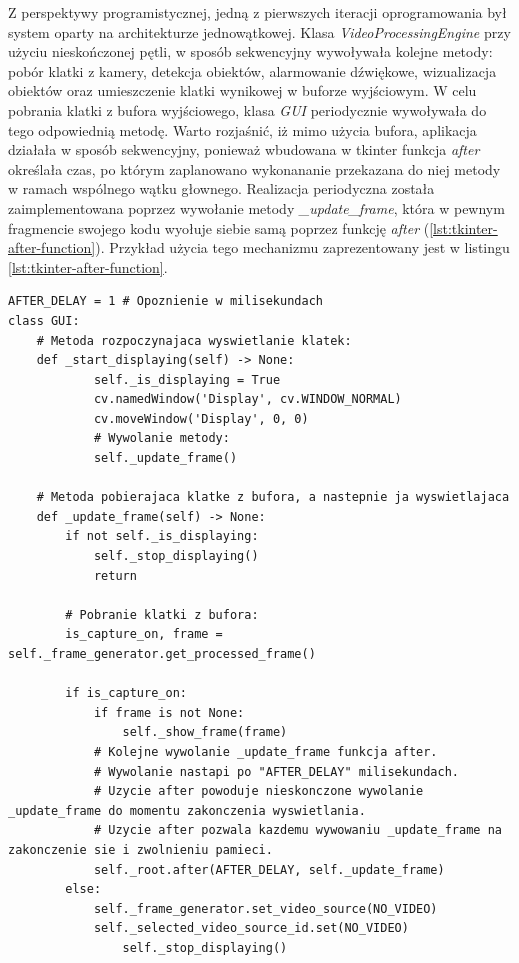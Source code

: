 Z perspektywy programistycznej, jedną z pierwszych iteracji oprogramowania był system oparty na architekturze jednowątkowej. Klasa \emph{VideoProcessingEngine} przy użyciu nieskończonej pętli, w sposób sekwencyjny wywoływała kolejne metody: pobór klatki z kamery, detekcja obiektów, alarmowanie dźwiękowe, wizualizacja obiektów oraz umieszczenie klatki wynikowej w buforze wyjściowym. W celu pobrania klatki z bufora wyjściowego, klasa \emph{GUI} periodycznie wywoływała do tego odpowiednią metodę. Warto rozjaśnić, iż mimo użycia bufora, aplikacja działała w sposób sekwencyjny, ponieważ wbudowana w tkinter funkcja \emph{after} określała czas, po którym zaplanowano wykonananie przekazana do niej metody w ramach wspólnego wątku głownego. Realizacja periodyczna została zaimplementowana poprzez wywołanie metody \emph{\_update\_frame}, która w pewnym fragmencie swojego kodu wyołuje siebie samą poprzez funkcję \emph{after} (\ref{lst:tkinter-after-function}). Przykład użycia tego mechanizmu zaprezentowany jest w listingu \ref{lst:tkinter-after-function}.

\begin{lstlisting}[caption={Fragment kodu zawierający użycie mechanizmu \emph{after}}, label={lst:tkinter-after-function}]
AFTER_DELAY = 1 # Opoznienie w milisekundach
class GUI:
    # Metoda rozpoczynajaca wyswietlanie klatek:
    def _start_displaying(self) -> None:
            self._is_displaying = True
            cv.namedWindow('Display', cv.WINDOW_NORMAL)
            cv.moveWindow('Display', 0, 0)
            # Wywolanie metody:
            self._update_frame()

    # Metoda pobierajaca klatke z bufora, a nastepnie ja wyswietlajaca
    def _update_frame(self) -> None:
        if not self._is_displaying:
            self._stop_displaying()
            return

        # Pobranie klatki z bufora:
        is_capture_on, frame = self._frame_generator.get_processed_frame()

        if is_capture_on:
            if frame is not None:
                self._show_frame(frame)
            # Kolejne wywolanie _update_frame funkcja after.
            # Wywolanie nastapi po "AFTER_DELAY" milisekundach.
            # Uzycie after powoduje nieskonczone wywolanie _update_frame do momentu zakonczenia wyswietlania.
            # Uzycie after pozwala kazdemu wywowaniu _update_frame na zakonczenie sie i zwolnieniu pamieci. 
            self._root.after(AFTER_DELAY, self._update_frame)
        else:
            self._frame_generator.set_video_source(NO_VIDEO)
            self._selected_video_source_id.set(NO_VIDEO)
                self._stop_displaying()
\end{lstlisting}

